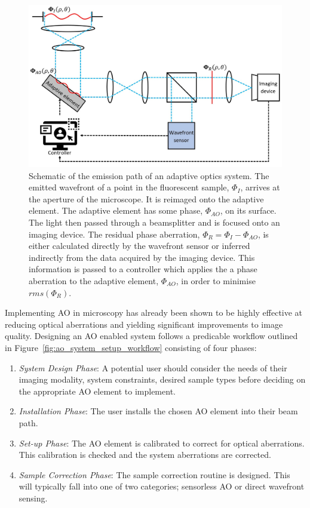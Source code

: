 \begin{figure}[h]
	\centering
	\includegraphics[width=\textwidth]{images/ao_system_schematic_simple.jpg}
	\caption[Schematic of the emission path of an adaptive optics system.]{Schematic of the emission path of an adaptive optics system. The emitted wavefront of a point in the fluorescent sample, $\Phi_{I}$, arrives at the aperture of the microscope. It is reimaged onto the adaptive element. The adaptive element has some phase, $\Phi_{AO}$, on its surface. The light then passed through a beamsplitter and is focused onto an imaging device. The residual phase aberration, $\Phi_{R} = \Phi_{I} - \Phi_{AO}$, is either calculated directly by the wavefront sensor or inferred indirectly from the data acquired by the imaging device. This information is passed to a controller which applies the a phase aberration to the adaptive element, $\Phi_{AO}$, in order to minimise $rms(\Phi_{R})$.}
	\label{fig:ao_system_schematic_simple}
\end{figure}

Implementing AO in microscopy has already been shown to be highly 
effective at reducing optical aberrations and yielding significant 
improvements to image 
quality\cite{booth2014adaptive,girkin2009adaptive,fraisier2015adaptive,jesacher2011sensorless,
	jian2014wavefront}. Designing an AO enabled system follows a predicable 
workflow outlined in Figure~\ref{fig:ao_system_setup_workflow} 
consisting of four phases:

\begin{enumerate}
	\item \textit{System Design Phase}: A potential user should consider 
	the needs of their imaging modality, system constraints, desired 
	sample types before deciding on the appropriate AO element to 
	implement.
	\item \textit{Installation Phase}: The user installs the chosen AO 
	element into their beam path.
	\item \textit{Set-up Phase}: The AO element is calibrated to correct 
	for optical aberrations. This calibration is checked and the system 
	aberrations are corrected.
	\item \textit{Sample Correction Phase}: The sample correction routine 
	is designed. This will typically fall into one of two categories; 
	sensorless AO or direct wavefront sensing.
\end{enumerate}  


